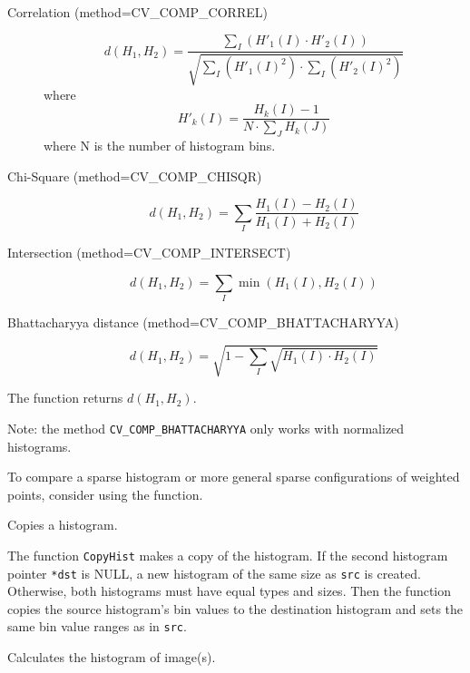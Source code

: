 \begin{description}
\item[Correlation (method=CV\_COMP\_CORREL)]
\[
d(H_1,H_2) = \frac
{\sum_I (H'_1(I) \cdot H'_2(I))}
{\sqrt{\sum_I(H'_1(I)^2) \cdot \sum_I(H'_2(I)^2)}}
\]
where
\[
H'_k(I) = \frac{H_k(I) - 1}{N \cdot \sum_J H_k(J)}
\]
where N is the number of histogram bins.

\item[Chi-Square (method=CV\_COMP\_CHISQR)]
\[ d(H_1,H_2) = \sum_I \frac{H_1(I)-H_2(I)}{H_1(I)+H_2(I)} \]

\item[Intersection (method=CV\_COMP\_INTERSECT)]
\[ d(H_1,H_2) = \sum_I \min (H_1(I), H_2(I)) \]

\item[Bhattacharyya distance (method=CV\_COMP\_BHATTACHARYYA)]
\[ d(H_1,H_2) = \sqrt{1 - \sum_I \sqrt{H_1(I) \cdot H_2(I)}} \]

\end{description}

The function returns $d(H_1, H_2)$.

Note: the method \texttt{CV\_COMP\_BHATTACHARYYA} only works with normalized histograms.

To compare a sparse histogram or more general sparse configurations of weighted points, consider using the  function.

\label{CopyHist}

Copies a histogram.


\begin{description}
\end{description}

The function \texttt{CopyHist} makes a copy of the histogram. If the
second histogram pointer \texttt{*dst} is NULL, a new histogram of the
same size as \texttt{src} is created. Otherwise, both histograms must
have equal types and sizes. Then the function copies the source histogram's
bin values to the destination histogram and sets the same bin value ranges
as in \texttt{src}.

\label{CalcHist}

Calculates the histogram of image(s).


